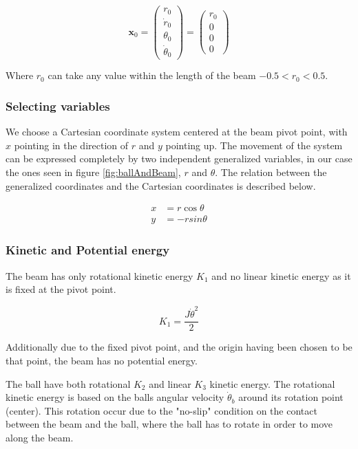 \documentclass[a4paper, titlepage]{article}
\begin{document}
\begin{equation}
\textbf{x}_0 = 
\begin{pmatrix}
r_0 \\ \dot{r}_0 \\ \theta_0 \\ \dot{\theta}_0
\end{pmatrix} = 
\begin{pmatrix}
r_0 \\ 0 \\ 0 \\ 0
\end{pmatrix}
\label{equ:stateEqulibrium}
\end{equation}

Where $r_0$ can take any value within the length of the beam $-0.5 < r_0 < 0.5$.

\subsubsection{Selecting variables}
We choose a Cartesian coordinate system centered at the beam pivot point, with $x$ pointing in the direction of $r$ and $y$ pointing up.
The movement of the system can be expressed completely by two independent generalized variables, in our case the ones seen in figure \ref{fig:ballAndBeam}, $r$ and $\theta$.
The relation between the generalized coordinates and the Cartesian coordinates is described below.

\begin{equation}
\begin{split}
x &= r\cos{\theta} \\
y &= -rsin{\theta}
\end{split}
\end{equation}

\subsubsection{Kinetic and Potential energy}
The beam has only rotational kinetic energy $K_1$ and no linear kinetic energy as it is fixed at the pivot point.

\begin{equation}
K_1 = \frac{J\dot{\theta}^2}{2}
\end{equation}

Additionally due to the fixed pivot point, and the origin having been chosen to be that point, the beam has no potential energy.

The ball have both rotational $K_2$ and linear $K_3$ kinetic energy.
The rotational kinetic energy is based on the balls angular velocity $\dot{\theta}_b$ around its rotation point (center).
This rotation occur due to the "no-slip" condition on the contact between the beam and the ball, where the ball has to rotate in order to  move along the beam.
\end{document}
